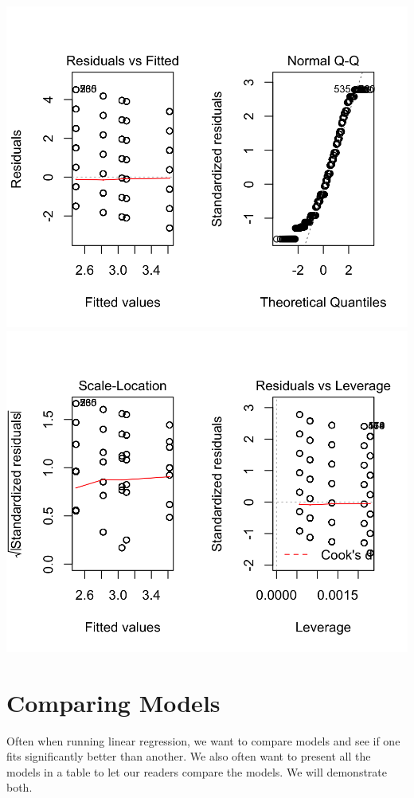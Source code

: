 \documentclass[]{tufte-book}
\theoremstyle{definition}
\theoremstyle{definition}
\theoremstyle{remark}
\begin{document}
\includegraphics{_main_files/figure-latex/unnamed-chunk-68-1}
\includegraphics{_main_files/figure-latex/unnamed-chunk-68-2}

\section*{Comparing Models}\label{comparing-models}

Often when running linear regression, we want to compare models and see
if one fits significantly better than another. We also often want to
present all the models in a table to let our readers compare the models.
We will demonstrate both.
\end{document}
